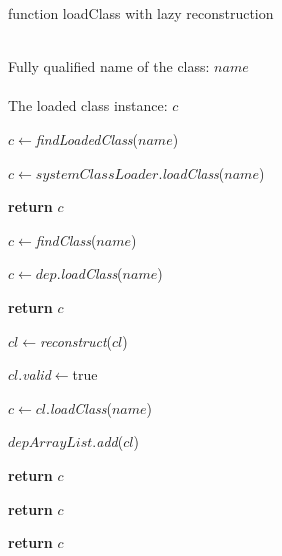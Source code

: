 \documentclass[conference]{IEEEtran}
\begin{document}
\begin{algorithm}[ht]
\caption{function loadClass with lazy reconstruction}
\label{alg:Delay_Class_Loader}
\begin{algorithmic}[1]
\REQUIRE ~~\\
Fully qualified name of the class: $name$ \\

\ENSURE ~~\\
The loaded class instance: $c$

\STATE $c\leftarrow$\emph{findLoadedClass}($name$)

	
	
		\STATE $c\leftarrow systemClassLoader.$\emph{loadClass}($name$)
	

			\STATE \textbf{return} $c$
	
		\ENDIF

	\ELSE

		\STATE $c\leftarrow$\emph{findClass}($name$)



				\STATE $c\leftarrow dep.$\emph{loadClass}($name$)

			
					\STATE \textbf{return} $c$

				\ENDIF
			
			\ENDFOR

				


					\STATE $cl\leftarrow$\emph{reconstruct}($cl$)
				
					\STATE $cl.$\emph{valid}$\leftarrow$true

				\ENDIF

				\STATE $c\leftarrow cl.$\emph{loadClass}($name$)


					\STATE $depArrayList$.\emph{add}($cl$)
			
					\STATE \textbf{return} $c$

				\ENDIF
			
			\ENDFOR
	
	
		\ELSE

			\STATE \textbf{return} $c$

		\ENDIF

	\ENDIF

\ELSE

	\STATE \textbf{return} $c$

\ENDIF


\end{algorithmic}
\end{algorithm}
\end{document}
